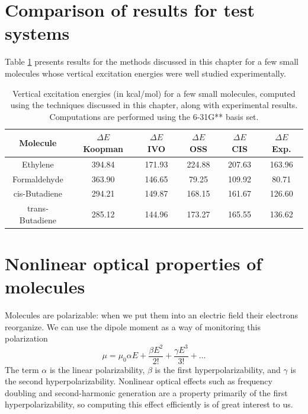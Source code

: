 
\section{Comparison of results for test systems}
Table \ref{excited} presents results for the methods discussed in this
chapter for a few small molecules whose vertical excitation energies
were well studied experimentally.

\begin{table}
\caption{Vertical excitation energies (in kcal/mol) for a few small
molecules, computed using the techniques discussed in this chapter,
along with experimental results. Computations are performed using the
6-31G** basis set.}
\label{excited}
\begin{center}
\begin{tabular}{cccccc}\hline\hline
Molecule & $\Delta E$ Koopman &  $\Delta E$ IVO &  $\Delta E$ OSS &
  $\Delta E$ CIS &  $\Delta E$ Exp.\\ \hline
Ethylene        & 394.84 & 171.93 & 224.88 & 207.63 & 163.96 \\
Formaldehyde    & 363.90 & 146.65 & 79.25  & 109.92 & 80.71 \\
cis-Butadiene   & 294.21 & 149.87 & 168.15 & 161.67 & 126.60 \\
trans-Butadiene & 285.12 & 144.96 & 173.27 & 165.55 & 136.62 \\
\hline\hline
\end{tabular}
\end{center}
\end{table}


\section{Nonlinear optical properties of molecules}
Molecules are polarizable: when we put them into an electric field
their electrons reorganize. We can use the dipole moment as a way of
monitoring this polarization
\begin{equation}
 \mu = \mu_0 \alpha E + \frac{\beta E^2}{2!} + \frac{\gamma E^3}{3!} +
  \dots
\label{dipole-nlo}
\end{equation}
The term $\alpha$ is the linear polarizability, $\beta$ is the first
hyperpolarizability, and $\gamma$ is the second
hyperpolarizability. Nonlinear optical effects such as frequency
doubling and second-harmonic generation are a property primarily of
the first hyperpolarizability, so computing this effect efficiently is
of great interest to us.

